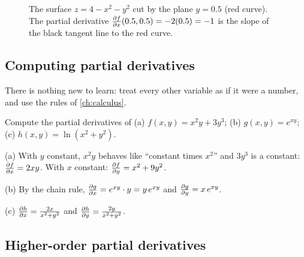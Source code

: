 \begin{figure}[htbp]
\centering
{}
\caption{The surface $z = 4 - x^2 - y^2$ cut by the plane $y = 0.5$ (red
  curve). The partial derivative $\frac{\partial f}{\partial x}(0.5, 0.5) = -2(0.5) = -1$ is the
  slope of the black tangent line to the red curve.}
\label{fig:partial-slice}
\end{figure}

\subsection{Computing partial derivatives}

There is nothing new to learn: treat every other variable as if it were a
number, and use the rules of \cref{ch:calculus}.

\begin{example}\label{ex:partials}
Compute the partial derivatives of (a) $f(x, y) = x^2y + 3y^3$;
(b) $g(x, y) = e^{xy}$; (c) $h(x, y) = \ln(x^2 + y^2)$.

\sol (a) With $y$ constant, $x^2y$ behaves like ``constant times $x^2$'' and
$3y^3$ is a constant: $\frac{\partial f}{\partial x} = 2xy$. With $x$ constant:
$\frac{\partial f}{\partial y} = x^2 + 9y^2$.

(b) By the chain rule, $\frac{\partial g}{\partial x} = e^{xy}\cdot y = y\,e^{xy}$ and
$\frac{\partial g}{\partial y} = x\,e^{xy}$.

(c) $\frac{\partial h}{\partial x} = \frac{2x}{x^2 + y^2}$ and $\frac{\partial h}{\partial y} =
\frac{2y}{x^2 + y^2}$.
\end{example}

\subsection{Higher-order partial derivatives}

